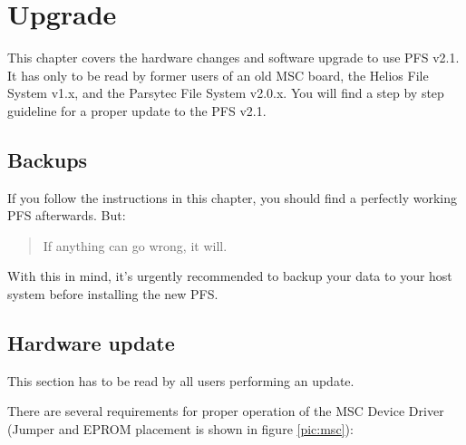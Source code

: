 \chapter{Upgrade}\label{chap:upgrade}

This chapter covers the hardware changes and software upgrade to use PFS v2.1.
It has only to be read by former users of an old MSC board, the Helios File
System v1.x, and the Parsytec File System v2.0.x. You will find a step by step
guideline for a proper update to the PFS v2.1.

\section{Backups}
If you follow the instructions in this chapter, you should find a perfectly 
working PFS afterwards. But:
\begin{verse}
{\large \sf If anything can go wrong, it will.} \\
\end{verse}

With this in mind, it's urgently recommended to backup your data to your host
system before installing the new PFS.

\section{Hardware update}  \label{sec:hwupdate}
This section has to be read by all users performing an update.

There are several requirements for proper operation of the MSC Device Driver
(Jumper and EPROM placement is shown in figure \ref{pic:msc}):

